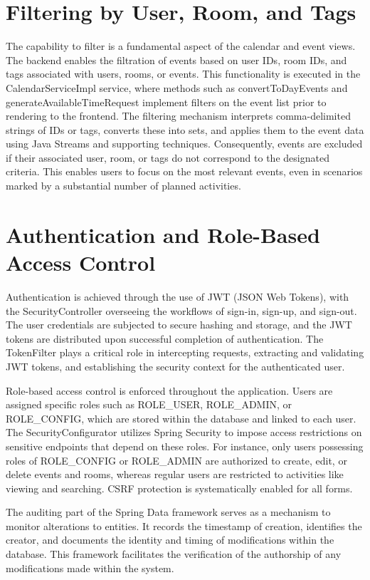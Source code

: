 \section{Filtering by User, Room, and Tags}\label{sec:filtering-by-user-room-and-tags}
The capability to filter is a fundamental aspect of the calendar and event views.
The backend enables the filtration of events based on user IDs, room IDs, and tags associated with users, rooms, or events.
This functionality is executed in the CalendarServiceImpl service, where methods such as convertToDayEvents and generateAvailableTimeRequest implement filters on the event list prior to rendering to the frontend.
The filtering mechanism interprets comma-delimited strings of IDs or tags, converts these into sets, and applies them to the event data using Java Streams and supporting techniques.
Consequently, events are excluded if their associated user, room, or tags do not correspond to the designated criteria.
This enables users to focus on the most relevant events, even in scenarios marked by a substantial number of planned activities.


\section{Authentication and Role-Based Access Control}\label{sec:authentication-and-role-based-access-control}
Authentication is achieved through the use of JWT (JSON Web Tokens), with the SecurityController overseeing the workflows of sign-in, sign-up, and sign-out.
The user credentials are subjected to secure hashing and storage, and the JWT tokens are distributed upon successful completion of authentication.
The TokenFilter plays a critical role in intercepting requests, extracting and validating JWT tokens, and establishing the security context for the authenticated user.

Role-based access control is enforced throughout the application.
Users are assigned specific roles such as ROLE\_USER, ROLE\_ADMIN, or ROLE\_CONFIG, which are stored within the database and linked to each user.
The SecurityConfigurator utilizes Spring Security to impose access restrictions on sensitive endpoints that depend on these roles.
For instance, only users possessing roles of ROLE\_CONFIG or ROLE\_ADMIN are authorized to create, edit, or delete events and rooms, whereas regular users are restricted to activities like viewing and searching.
CSRF protection is systematically enabled for all forms.

The auditing part of the Spring Data framework\cite{AuditingSpringData} serves as a mechanism to monitor alterations to entities.
It records the timestamp of creation, identifies the creator, and documents the identity and timing of modifications within the database.
This framework facilitates the verification of the authorship of any modifications made within the system.


